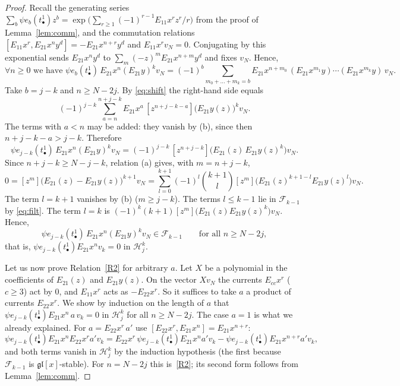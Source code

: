 \documentclass[11pt]{amsart}
\numberwithin{equation}{section}
\theoremstyle{definition}
\newcommand{\gl}{\mathfrak{gl}}
\begin{document}
\begin{proof}
		Recall the generating series $\sum_b\psi e_b(t^1_\bullet)z^b=\exp\big(\sum_{r\ge1}(-1)^{r-1}E_{11}x^rz^r/r\big)$ from the proof of Lemma~\ref{lem:comm},
		and the commutation relations $[E_{11}x^r,E_{21}x^ny^d]=-E_{21}x^{n+r}y^d$ and $E_{11}x^rv_N=0$. Conjugating by this exponential sends
		$E_{21}x^ny^d$ to $\sum_m(-z)^mE_{21}x^{n+m}y^d$ and fixes $v_N$. Hence, 
		\begin{equation}\label{eq:shift}
			\forall n\geq 0 \text{ we have } \psi e_b(t^1_\bullet)\,E_{21}x^n(E_{21}y)^kv_N=(-1)^b\!\!\sum_{m_0+\dots+m_k=b}\!\!E_{21}x^{n+m_0}\,(E_{21}x^{m_1}y)\cdots(E_{21}x^{m_k}y)\,v_N .
		\end{equation}
		Take $b=j-k$ and $n\ge N-2j$. By \eqref{eq:shift} the right-hand side equals
		$$(-1)^{j-k}\sum_{a=n}^{n+j-k}E_{21}x^a\,[z^{n+j-k-a}]\bigl(E_{21}y(z)\bigr)^kv_N.$$
		The terms with $a<n$ may be added: they
		vanish by (b), since then $n+j-k-a>j-k$. Therefore
		\[
		\psi e_{j-k}(t^1_\bullet)\,E_{21}x^n(E_{21}y)^kv_N=(-1)^{j-k}\,[z^{n+j-k}]\big(E_{21}(z)\,E_{21}y(z)^k\big)v_N .
		\]
		Since $n+j-k\ge N-j-k$, relation (a) gives, with $m=n+j-k$,
		\[
		0=[z^m]\big(E_{21}(z)-E_{21}y(z)\big)^{k+1}v_N=\sum_{l=0}^{k+1}(-1)^l\binom{k+1}{l}[z^m]\big(E_{21}(z)^{k+1-l}E_{21}y(z)^l\big)v_N .
		\]
		The term $l=k+1$ vanishes by (b) ($m\ge j-k$). The terms $l\le k-1$ lie in $\mathcal F_{k-1}$ by \eqref{eq:filt}.
		The term $l=k$ is $(-1)^k(k+1)[z^m]\big(E_{21}(z)E_{21}y(z)^k\big)v_N$. Hence,
		\[
		\psi e_{j-k}(t^1_\bullet)\,E_{21}x^n(E_{21}y)^kv_N\in\mathcal F_{k-1}\qquad\text{for all }n\ge N-2j,
		\]
		that is, $\psi e_{j-k}(t^1_\bullet)E_{21}x^{n}v_k=0$ in $\mathcal H_j^k$.
		
		Let us now prove Relation~\ref{R2} for arbitrary $a$. Let $X$ be a polynomial in the coefficients of $E_{21}(z)$ and
		$E_{21}y(z)$. On the vector $Xv_N$ the currents $E_{cc}x^r$ ($c\ge3$) act by $0$, and $E_{11}x^r$ acts as $-E_{22}x^r$. So it suffices to take
		$a$ a product of currents $E_{22}x^r$. We show by induction on the length of $a$ that
		$\psi e_{j-k}(t^1_\bullet)E_{21}x^n\,a\,v_k=0$ in $\mathcal H_j^k$ for all $n\ge N-2j$. The case $a=1$ is what we already explained. For
		$a=E_{22}x^r\,a'$ use $[E_{22}x^r,E_{21}x^n]=E_{21}x^{n+r}$:
		\[
		\psi e_{j-k}(t^1_\bullet)E_{21}x^nE_{22}x^ra'v_k=E_{22}x^r\,\psi e_{j-k}(t^1_\bullet)E_{21}x^na'v_k-\psi e_{j-k}(t^1_\bullet)E_{21}x^{n+r}a'v_k ,
		\]
		and both terms vanish in $\mathcal H_j^k$ by the induction hypothesis (the first because $\mathcal F_{k-1}$ is $\gl[x]$-stable).
		For $n=N-2j$ this is~\ref{R2}; its second form follows from Lemma~\ref{lem:comm}.
		

\end{proof}
\end{document}
